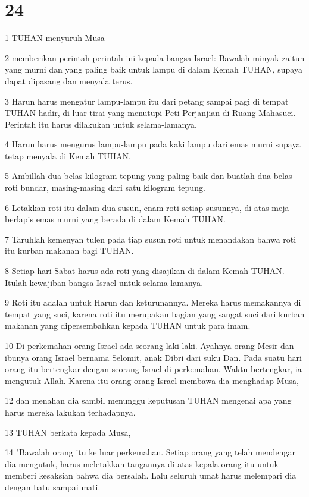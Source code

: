 \chapter{24}

\par 1 TUHAN menyuruh Musa
\par 2 memberikan perintah-perintah ini kepada bangsa Israel: Bawalah minyak zaitun yang murni dan yang paling baik untuk lampu di dalam Kemah TUHAN, supaya dapat dipasang dan menyala terus.
\par 3 Harun harus mengatur lampu-lampu itu dari petang sampai pagi di tempat TUHAN hadir, di luar tirai yang menutupi Peti Perjanjian di Ruang Mahasuci. Perintah itu harus dilakukan untuk selama-lamanya.
\par 4 Harun harus mengurus lampu-lampu pada kaki lampu dari emas murni supaya tetap menyala di Kemah TUHAN.
\par 5 Ambillah dua belas kilogram tepung yang paling baik dan buatlah dua belas roti bundar, masing-masing dari satu kilogram tepung.
\par 6 Letakkan roti itu dalam dua susun, enam roti setiap susunnya, di atas meja berlapis emas murni yang berada di dalam Kemah TUHAN.
\par 7 Taruhlah kemenyan tulen pada tiap susun roti untuk menandakan bahwa roti itu kurban makanan bagi TUHAN.
\par 8 Setiap hari Sabat harus ada roti yang disajikan di dalam Kemah TUHAN. Itulah kewajiban bangsa Israel untuk selama-lamanya.
\par 9 Roti itu adalah untuk Harun dan keturunannya. Mereka harus memakannya di tempat yang suci, karena roti itu merupakan bagian yang sangat suci dari kurban makanan yang dipersembahkan kepada TUHAN untuk para imam.
\par 10 Di perkemahan orang Israel ada seorang laki-laki. Ayahnya orang Mesir dan ibunya orang Israel bernama Selomit, anak Dibri dari suku Dan. Pada suatu hari orang itu bertengkar dengan seorang Israel di perkemahan. Waktu bertengkar, ia mengutuk Allah. Karena itu orang-orang Israel membawa dia menghadap Musa,
\par 12 dan menahan dia sambil menunggu keputusan TUHAN mengenai apa yang harus mereka lakukan terhadapnya.
\par 13 TUHAN berkata kepada Musa,
\par 14 "Bawalah orang itu ke luar perkemahan. Setiap orang yang telah mendengar dia mengutuk, harus meletakkan tangannya di atas kepala orang itu untuk memberi kesaksian bahwa dia bersalah. Lalu seluruh umat harus melempari dia dengan batu sampai mati.
